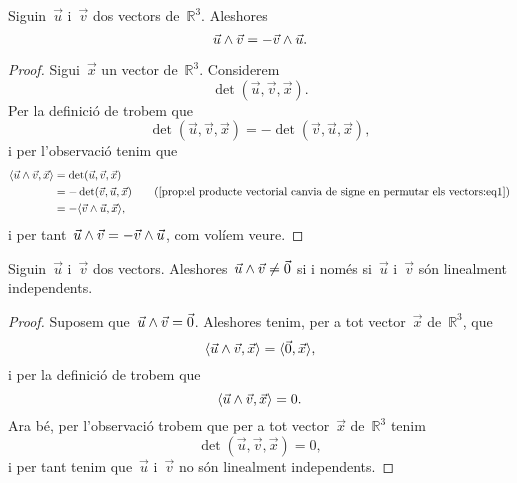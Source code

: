 \documentclass[../../main.tex]{subfiles}
\begin{document}
	\begin{proposition}
	\label{prop:el producte vectorial canvia de signe en permutar els vectors}
		Siguin~\(\vec{u}\) i~\(\vec{v}\) dos vectors de~\(\mathbb{R}^{3}\).
		Aleshores
		\[
		    \vec{u}\mathbin{\wedge}\vec{v}=-\vec{v}\mathbin{\wedge}\vec{u}.
		\]
		\begin{proof}
			Sigui~\(\vec{x}\) un vector de~\(\mathbb{R}^{3}\).
			Considerem
			\[
			    \det(\vec{u},\vec{v},\vec{x}).
			\]
			Per la definició de  trobem que %
			\begin{equation}
				\label{prop:el producte vectorial canvia de signe en permutar els vectors:eq1}
				\det(\vec{u},\vec{v},\vec{x})=-\det(\vec{v},\vec{u},\vec{x}),
			\end{equation}
			i per l'observació  tenim que
			\begin{align*}
				\prodesc{\vec{u}\prodvec\vec{v}}{\vec{x}}&=\det(\vec{u},\vec{v},\vec{x}) \\
				&=-\det(\vec{v},\vec{u},\vec{x}) \tag{\ref{prop:el producte vectorial canvia de signe en permutar els vectors:eq1}}\\
				&=-\prodesc{\vec{v}\prodvec\vec{u}}{\vec{x}},
			\end{align*}
			i per tant~\(\vec{u}\mathbin{\wedge}\vec{v}=-\vec{v}\mathbin{\wedge}\vec{u}\), com volíem veure.
		\end{proof}
	\end{proposition}
	\begin{proposition}
		\label{prop:el producte vectorial és zero si i només si els vectors no són linealment independents}
		Siguin~\(\vec{u}\) i~\(\vec{v}\) dos vectors.
		Aleshores~\(\vec{u}\mathbin{\wedge}\vec{v}\neq\vec{0}\) si i només si~\(\vec{u}\) i~\(\vec{v}\) són linealment independents.
		\begin{proof}
			Suposem que~\(\vec{u}\mathbin{\wedge}\vec{v}=\vec{0}\).
			Aleshores tenim, per a tot vector~\(\vec{x}\) de~\(\mathbb{R}^{3}\), que
			\[
			    \prodesc{\vec{u}\prodvec\vec{v}}{\vec{x}}=\prodesc{\vec{0}}{\vec{x}},
			\]
			i per la definició de  trobem que
			\[
			    \prodesc{\vec{u}\prodvec\vec{v}}{\vec{x}}=0.
			\]
			Ara bé, per l'observació  trobem que per a tot vector~\(\vec{x}\) de~\(\mathbb{R}^{3}\) tenim
			\[
			    \det(\vec{u},\vec{v},\vec{x})=0,
			\]
			i per tant tenim que~\(\vec{u}\) i~\(\vec{v}\) no són linealment independents.
		\end{proof}
	\end{proposition}
\end{document}
